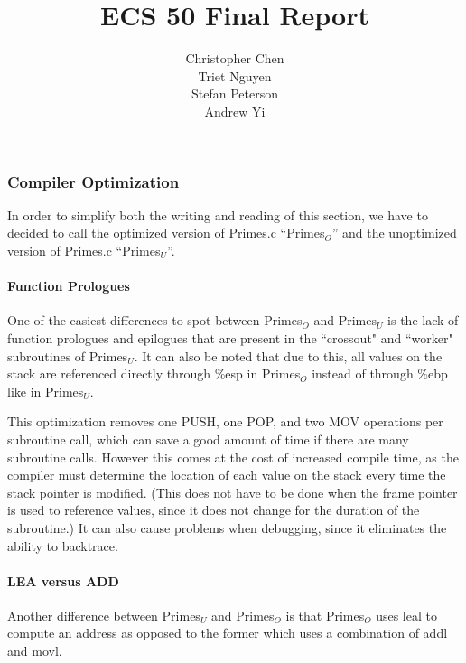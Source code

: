 \documentclass[11pt]{article}
\begin{document}
\begin{titlepage}
\title{\Huge ECS 50 Final Report}
\author{\huge Christopher Chen\\\huge Triet Nguyen\\\huge Stefan Peterson\\\huge Andrew Yi}
\maketitle
\end{titlepage}

\part{}
\section{Compiler Optimization}
In order to simplify both the writing and reading of this section, we have to decided to call the optimized version of Primes.c ``Primes$_{O}$'' and the unoptimized version of Primes.c ``Primes$_{U}$''.
\subsection{Function Prologues}
One of the easiest differences to spot between Primes$_{O}$ and Primes$_{U}$ is the lack of function prologues and epilogues that are present in the ``crossout" and ``worker" subroutines of Primes$_{U}$. It can also be noted that due to this, all values on the stack are referenced directly through \%esp in Primes$_{O}$ instead of through \%ebp like in Primes$_{U}$.

This optimization removes one PUSH, one POP, and two MOV operations per subroutine call, which can save a good amount of time if there are many subroutine calls. However this comes at the cost of increased compile time, as the compiler must determine the location of each value on the stack every time the stack pointer is modified. (This does not have to be done when the frame pointer is used to reference values, since it does not change for the duration of the subroutine.) It can also cause problems when debugging, since it eliminates the ability to backtrace. 
\subsection{LEA versus ADD}
Another difference between Primes$_{U}$ and Primes$_{O}$ is that Primes$_{O}$ uses leal to compute an address as opposed to the former which uses a combination of addl and movl. 
\end{document}
